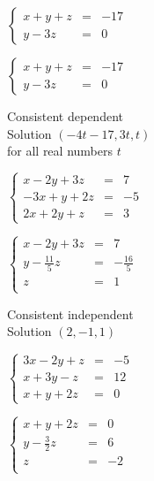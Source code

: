 \documentclass{ximera}
\begin{document}
\begin{question}
\begin{problem}
$\left\{ \begin{array}{rcr} x + y + z & = & -17  \\ y - 3z & = & 0  \end{array} \right.$

\begin{solution}
$\left\{ \begin{array}{rcr} x + y + z & = & -17  \\ y - 3z & = & 0  \end{array} \right.$
 

Consistent dependent\\
Solution $(-4t - 17, 3t, t)$\\
for all real numbers $t$
\end{solution}
\end{problem}

\begin{problem}
$\left\{ \begin{array}{rcr} x-2y+3z & = & 7 \\ -3x+y+2z & = & -5 \\ 2x+2y+z & = & 3  \end{array} \right.$

\begin{solution}
$\left\{ \begin{array}{rcr} x-2y+3z & = & 7  \\ y - \frac{11}{5}z & = & -\frac{16}{5} \\ z & = & 1 \\  \end{array} \right.$
 

Consistent independent\\
Solution $(2,-1,1)$
\end{solution}
\end{problem}

\begin{problem}
$\left\{ \begin{array}{rcr} 3x-2y+z & = & -5 \\ x+3y-z & = & 12 \\ x+y+2z & = & 0  \end{array} \right.$

\begin{solution}
$\left\{ \begin{array}{rcr} x+y+2z & = & 0  \\ y - \frac{3}{2}z & = & 6 \\ z & = & -2 \\  \end{array} \right.$
 


\end{solution}
\end{problem}
\end{question}
\end{document}
